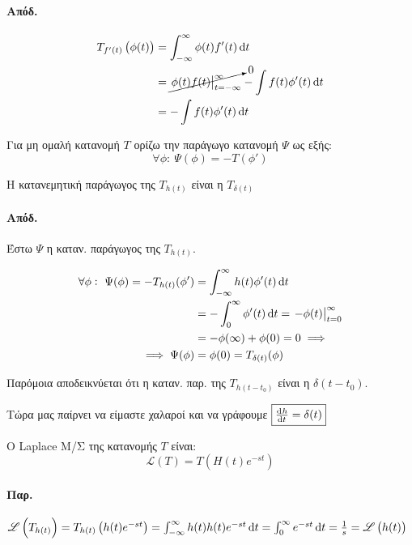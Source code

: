 \documentclass[11pt,a4paper,titlepage,draft]{article}
\begin{document}
\paragraph{Απόδ.}
\begin{align*}
T_{f'(t)}\left(\phi(t) \right) &= \int_{-\infty}^\infty\phi(t)f'(t)\dif t \\
&= \cancelto{0}{\left. \phi(t) f(t) \right|_{t=-\infty}^\infty} - \int f(t)\phi'(t) \dif t \\
&=- \int f(t)\phi'(t) \dif t
\end{align*}

\begin{defn}{}{}
Για μη ομαλή κατανομή \( T \) ορίζω την παράγωγο κατανομή \( \Psi \) ως εξής:
\[
\forall \phi: \ \Psi(\phi) = -T(\phi')
\]
\end{defn}

\begin{theorem}{}{}
Η κατανεμητική παράγωγος της \( T_{h(t)} \) είναι η \( T_{\delta(t)} \)
\end{theorem}
\paragraph{Απόδ.}
Έστω \( \Psi \) η καταν. παράγωγος της \( T_{h(t)} \).

\begin{align*}
\forall \phi:\ \Psi(\phi) = - T_{h(t)}(\phi') &=
\int_{-\infty}^\infty h(t) \phi'(t) \dif t
\\ &= - \int_0^\infty \phi'(t)\dif t = \left. -\phi(t) \right|_{t=0}^\infty
\\ &= -\phi(\infty) + \phi(0) = 0 \implies \\
\implies \Psi(\phi) &= \phi(0) = T_{\delta(t)}(\phi)
 \end{align*}
 
 Παρόμοια αποδεικνύεται ότι η καταν. παρ. της \( T_{h(t-t_0)} \) είναι η \( \delta(t-t_0) \).
 
 Τώρα μας παίρνει να είμαστε χαλαροί και να γράφουμε \(\boxed{ \od{h}{t} = \delta(t) }\)
 
\begin{defn}{}{}
Ο \textlatin{Laplace} Μ/Σ της κατανομής \( T \) είναι:
\[
\mathscr L (T) = T \left(H(t) e^{-st} \right)
\]
\end{defn}
\paragraph{Παρ.}
\( 
\mathscr L\left(T_{h(t)} \right) = T_{h(t)} \left(h(t)e^{-st} \right) = \int^\infty_{-\infty} h(t)h(t)e^{-st}\dif t = \int_0^\infty e^{-st} \dif t = \frac{1}{s} = \mathscr L\left(h(t)\right)
 \)
 
\end{document}
